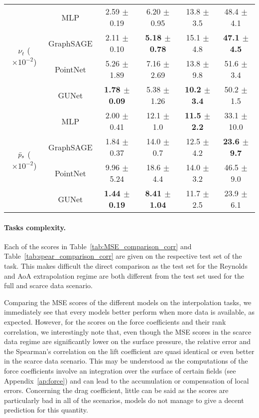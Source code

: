 \begin{table}
\begin{tabular}{cccccc}
		\midrule
		\multirow{4}{*}{$\nu_t$ ($\times 10^{-2}$)} & MLP & 2.59 $\pm$ 0.19 & 6.20 $\pm$ 0.95 & 13.8 $\pm$ 3.5 & 48.4 $\pm$ 4.1 \\
		& GraphSAGE & 2.11 $\pm$ 0.10 & \textbf{5.18 $\pm$ 0.78} & 15.1 $\pm$ 4.8 & \textbf{47.1 $\pm$ 4.5} \\
		& PointNet & 5.26 $\pm$ 1.89 & 7.16 $\pm$ 2.69 & 13.8 $\pm$ 9.8 & 51.6 $\pm$ 3.4 \\
		& GUNet & \textbf{1.78 $\pm$ 0.09} & 5.38 $\pm$ 1.26 & \textbf{10.2 $\pm$ 3.4} & 50.2 $\pm$ 1.5 \\
		\midrule
		\multirow{4}{*}{$\Bar{p}_{s}$ ($\times 10^{-2}$)} & MLP & 2.00 $\pm$ 0.41 & 12.1 $\pm$ 1.0 & \textbf{11.5 $\pm$ 2.2} & 33.1 $\pm$ 10.0 \\
		& GraphSAGE & 1.84 $\pm$ 0.37 & 14.0 $\pm$ 0.7 & 12.5 $\pm$ 4.2 & \textbf{23.6 $\pm$ 9.7} \\
		& PointNet & 9.96 $\pm$ 5.24 & 18.6 $\pm$ 4.4 & 14.0 $\pm$ 3.2 & 46.5 $\pm$ 9.0 \\
		& GUNet & \textbf{1.44 $\pm$ 0.19} & \textbf{8.41 $\pm$ 1.04} & 11.7 $\pm$ 2.5 & 23.9 $\pm$ 6.1 \\
		\bottomrule
	\end{tabular}
\end{table}

\paragraph{Tasks complexity.} Each of the scores in Table~\ref{tab:MSE_comparison_corr} and Table~\ref{tab:spear_comparison_corr} are given on the respective test set of the task. This makes difficult the direct comparison as the test set for the Reynolds and AoA extrapolation regime are both different from the test set used for the full and scarce data scenario.

Comparing the \acrshort{MSE} scores of the different models on the interpolation tasks, we immediately see that every models better perform when more data is available, as expected. However, for the scores on the force coefficients and their rank correlation, we interestingly note that, even though the \acrshort{MSE} scores in the scarce data regime are significantly lower on the surface pressure, the relative error and the Spearman's correlation on the lift coefficient are quasi identical or even better in the scarce data scenario. This may be understood as the computations of the force coefficients involve an integration over the surface of certain fields (see Appendix~\ref{ap:force}) and can lead to the accumulation or compensation of local errors. Concerning the drag coefficient, little can be said as the scores are particularly bad in all of the scenarios, models do not manage to give a decent prediction for this quantity.

